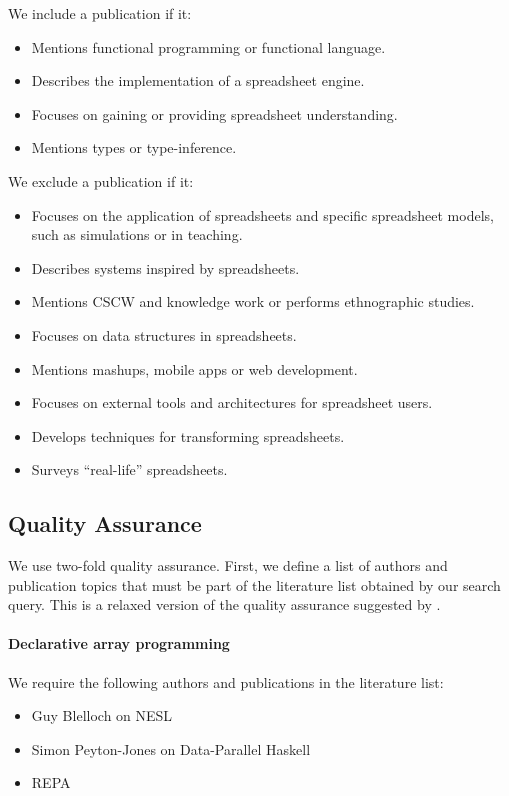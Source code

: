 \documentclass[a4paper]{article}
\begin{document}
We include a publication if it:

\begin{itemize}
\item Mentions functional programming or functional language.
\item Describes the implementation of a spreadsheet engine.
\item Focuses on gaining or providing spreadsheet understanding.
\item Mentions types or type-inference.
\end{itemize}

We exclude a publication if it:

\begin{itemize}
\item Focuses on the application of spreadsheets and specific
  spreadsheet models, such as simulations or in teaching.
\item Describes systems inspired by spreadsheets.
\item Mentions CSCW and knowledge work or performs ethnographic
  studies.
\item Focuses on data structures in spreadsheets.
\item Mentions mashups, mobile apps or web development.
\item Focuses on external tools and architectures for spreadsheet
  users.
\item Develops techniques for transforming spreadsheets.
\item Surveys ``real-life'' spreadsheets.
\end{itemize}

\subsection{Quality Assurance}
\label{sec:quality-assurance}

We use two-fold quality assurance. First, we define a list of authors and publication topics that must be part of the literature list obtained by our search query. This is a relaxed version of the quality assurance suggested by \citet{keele2007guidelines}.

\paragraph{Declarative array programming}

We require the following authors and publications in the literature list:

\begin{itemize}
\item Guy Blelloch on NESL
\item Simon Peyton-Jones on Data-Parallel Haskell
\item REPA
\end{itemize}
\end{document}
